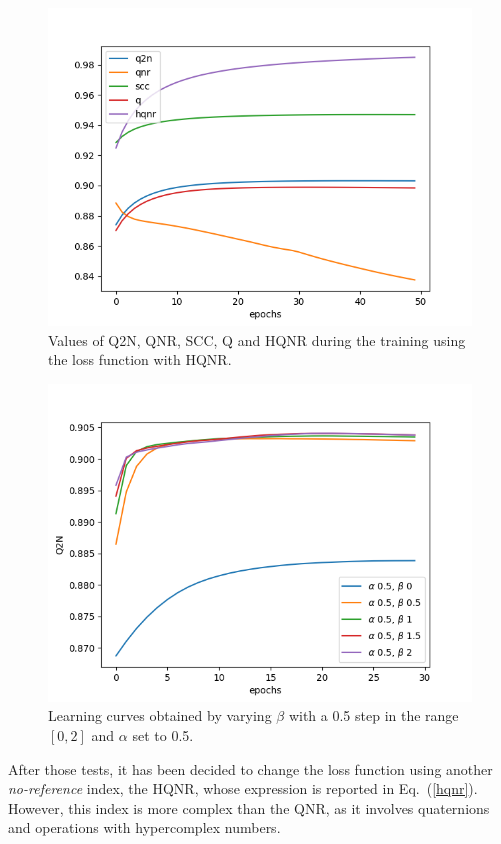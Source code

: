 \documentclass[12pt]{report}
\begin{document}
\begin{figure}[t]
    \centering
    \includegraphics[scale=.7]{toulouse_noref.png}
    \caption{Values of Q2N, QNR, SCC, Q and HQNR during the training using the loss function with HQNR.}
    \label{fig:hqnr1}
\end{figure}

\begin{figure}[t]
    \centering
    \includegraphics[scale=.7]{alpha_beta1.png}
    \caption{Learning curves obtained by varying $\beta$ with a 0.5 step in the range $[0,2]$ and $\alpha$ set to 0.5.}
    \label{fig:alpha_beta1}
\end{figure}

After those tests, it has been decided to change the loss function using another \textit{no-reference} index, the HQNR, whose expression is reported in Eq.~(\ref{hqnr}).
However, this index is more complex than the QNR, as it involves quaternions and operations with hypercomplex numbers.
\end{document}
